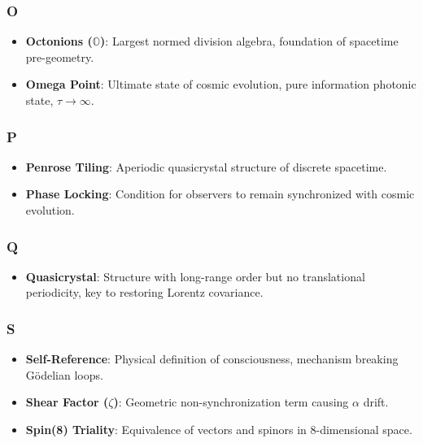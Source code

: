\subsubsection{O}

\begin{itemize}
\item \textbf{Octonions ($\mathbb{O}$)}: Largest normed division algebra, foundation of spacetime pre-geometry.
\item \textbf{Omega Point}: Ultimate state of cosmic evolution, pure information photonic state, $\tau \to \infty$.
\end{itemize}

\subsubsection{P}

\begin{itemize}
\item \textbf{Penrose Tiling}: Aperiodic quasicrystal structure of discrete spacetime.
\item \textbf{Phase Locking}: Condition for observers to remain synchronized with cosmic evolution.
\end{itemize}

\subsubsection{Q}

\begin{itemize}
\item \textbf{Quasicrystal}: Structure with long-range order but no translational periodicity, key to restoring Lorentz covariance.
\end{itemize}

\subsubsection{S}

\begin{itemize}
\item \textbf{Self-Reference}: Physical definition of consciousness, mechanism breaking G\"{o}delian loops.
\item \textbf{Shear Factor ($\zeta$)}: Geometric non-synchronization term causing $\alpha$ drift.
\item \textbf{Spin(8) Triality}: Equivalence of vectors and spinors in 8-dimensional space.
\end{itemize}

